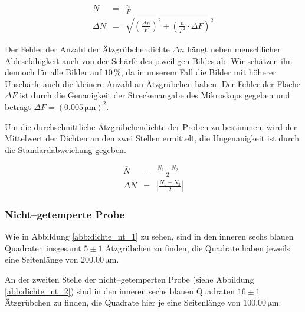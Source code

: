 \documentclass[12pt,a4paper]{scrartcl}
\numberwithin{equation}{section} %
\begin{document}
\begin{eqnarray}
    N &=& \frac{n}{F} \label{N}\\
    \Delta N &=& \sqrt{
        \left(\frac{\Delta n}{F}\right)^2
        + \left(\frac{n}{F^2} \cdot \Delta F\right)^2} \label{DeltaN}
\end{eqnarray}

\noindent
Der Fehler der Anzahl der Ätzgrübchendichte $\Delta n$ hängt neben menschlicher Ablesefähigkeit auch von der Schärfe des jeweiligen Bildes ab. Wir schätzen ihn dennoch für alle Bilder auf $10\,\%$, da in unserem Fall die Bilder mit höherer Unschärfe auch die kleinere Anzahl an Ätzgrübchen haben. Der Fehler der Fläche $\Delta F$ ist durch die Genauigkeit der Streckenangabe des Mikroskops gegeben und beträgt $\Delta F=(0.005 \mathrm{\, \mu m})^2$.

Um die durchschnittliche Ätzgrübchendichte der Proben zu bestimmen, wird der Mittelwert der Dichten an den zwei Stellen ermittelt, die Ungenauigkeit ist durch die Standardabweichung gegeben.

\begin{eqnarray}
    \bar{N} &=& \frac{N_1 + N_2}{2} \label{Nbar}\\
    \Delta \bar N &=& \left| \frac{N_1 - N_2}{2} \right| \label{DeltaNbar}
\end{eqnarray}

\hypertarget{nicht-getemperte-probe}{%
\subsubsection{Nicht--getemperte Probe}\label{nicht-getemperte-probe}}

Wie in Abbildung \ref{abb:dichte_nt_1} zu sehen, sind in den inneren sechs blauen Quadraten insgesamt $5\pm1$ Ätzgrübchen zu finden, die Quadrate haben jeweils eine Seitenlänge von $200.00 \mathrm{\,\mu m}$.

An der zweiten Stelle der nicht--getemperten Probe (siehe Abbildung \ref{abb:dichte_nt_2}) sind in den inneren sechs blauen Quadraten $16\pm1$ Ätzgrübchen zu finden, die Quadrate hier je eine Seitenlänge von $100.00 \mathrm{\, \mu m}$.
\end{document}
